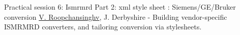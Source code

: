 
    \begin{abstract_online}{Practical session 6: Ismrmrd Part 2: xml style sheet : Siemens/GE/Bruker conversion}{%
        \underline{V. Roopchansinghv}, J. Derbyshire}{%
        }{%
        -}
    Building vendor-specific ISMRMRD converters, and tailoring conversion via stylesheets. 
    
    \end{abstract_online}
    